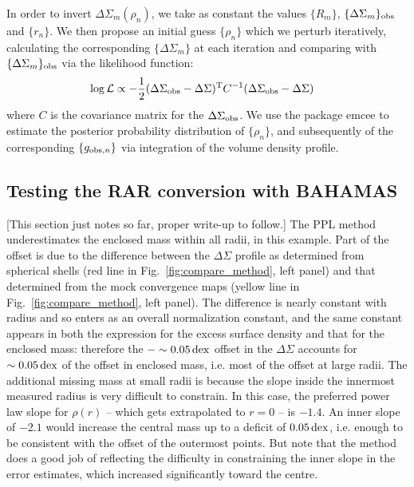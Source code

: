 \documentclass[usenatbib]{mnras}
\newcommand{\dex}{\, {\rm dex}}
\begin{document}
In order to invert $\Delta\Sigma_m(\rho_n)$, we take as constant the values $\{R_m\}$, $\{\Delta\Sigma_m\}_{\rm obs}$ and $\{r_n\}$. We then propose an initial guess $\{\rho_n\}$ which we perturb iteratively, calculating the corresponding $\{\Delta\Sigma_m\}$ at each iteration and comparing with $\{\Delta\Sigma_m\}_{\rm obs}$ via the likelihood function:
\begin{align}
\log\mathcal{L} &\propto -\frac{1}{2}(\Delta\Sigma_{\rm obs}-\Delta\Sigma)^{\rm T}C^{-1}(\Delta\Sigma_{\rm obs}-\Delta\Sigma)
\end{align}
where $C$ is the covariance matrix for the $\Delta\Sigma_{\rm obs}$. We use the package {\sc emcee} \citep{foreman-mackey13} to estimate the posterior probability distribution of $\{\rho_n\}$, and subsequently of the corresponding $\{g_{{\rm obs},n}\}$ via integration of the volume density profile.


\subsection{Testing the RAR conversion with BAHAMAS}
\label{sec:conversion_test}

[This section just notes so far, proper write-up to follow.] The PPL method underestimates the enclosed mass within all radii, in this example. Part of the offset is due to the difference between the $\Delta\Sigma$ profile as determined from spherical shells (red line in Fig.~\ref{fig:compare_method}, left panel) and that determined from the mock convergence maps (yellow line in Fig.~\ref{fig:compare_method}, left panel). The difference is nearly constant with radius and so enters as an overall normalization constant, and the same constant appears in both the expression for the excess surface density and that for the enclosed mass: therefore the $-\sim0.05 \dex$ offset in the $\Delta\Sigma$ accounts for $\sim0.05 \dex$ of the offset in enclosed mass, i.e. most of the offset at large radii. The additional missing mass at small radii is because the slope inside the innermost measured radius is very difficult to constrain. In this case, the preferred power law slope for $\rho(r)$ -- which gets extrapolated to $r=0$ -- is $-1.4$. An inner slope of $-2.1$ would increase the central mass up to a deficit of $0.05 \dex$, i.e. enough to be consistent with the offset of the outermost points. But note that the method does a good job of reflecting the difficulty in constraining the inner slope in the error estimates, which increased significantly toward the centre.
\end{document}
